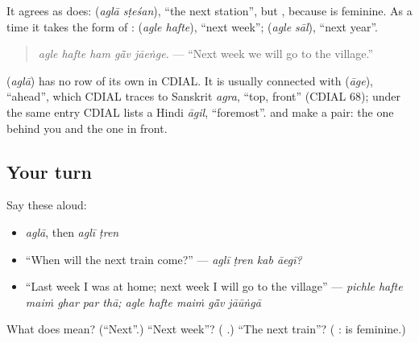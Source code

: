 It agrees as \textbf{} does: \textbf{ } (\emph{aglā sṭeśan}), \textquotedblleft{}the next station\textquotedblright{}, but \textbf{ }, because \textbf{} is feminine. As a time it takes the form of \textbf{ }: \textbf{ } (\emph{agle hafte}), \textquotedblleft{}next week\textquotedblright{}; \textbf{ } (\emph{agle sāl}), \textquotedblleft{}next year\textquotedblright{}.

\begin{quote}
\textbf{    }
\end{quote}

\begin{quote}
\emph{agle hafte ham gā̃v jāeṅge.} — \textquotedblleft{}Next week we will go to the village.\textquotedblright{}
\end{quote}

\begin{cousinweb}
\textbf{} (\emph{aglā}) has no row of its own in CDIAL. It is usually connected with \textbf{} (\emph{āge}), \textquotedblleft{}ahead\textquotedblright{}, which CDIAL traces to Sanskrit \emph{agra}, \textquotedblleft{}top, front\textquotedblright{} (CDIAL 68); under the same entry CDIAL lists a Hindi \emph{āgil}, \textquotedblleft{}foremost\textquotedblright{}. \textbf{} and \textbf{} make a pair: the one behind you and the one in front.
\end{cousinweb}

\subsection*{Your turn}
Say these aloud:

\begin{itemize}
\raggedright
  \item \emph{aglā}, then \emph{aglī ṭren}
  \item \textquotedblleft{}When will the next train come?\textquotedblright{} — \emph{aglī ṭren kab āegī?}
  \item \textquotedblleft{}Last week I was at home; next week I will go to the village\textquotedblright{} — \emph{pichle hafte maiṁ ghar par thā; agle hafte maiṁ gā̃v jāūṅgā}
\end{itemize}

\begin{tcolorbox}[breakable,colback=teal!4,colframe=teal!35!black,title={Before you move on}]
What does \textbf{} mean? (\textquotedblleft{}Next\textquotedblright{}.) \textquotedblleft{}Next week\textquotedblright{}? (\textbf{ }.) \textquotedblleft{}The next train\textquotedblright{}? (\textbf{ }: \textbf{} is feminine.)
\end{tcolorbox}
